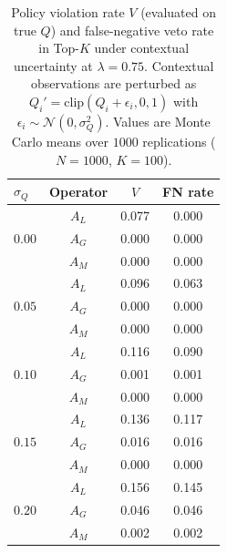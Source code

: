 \begin{table}[H]
\caption{Policy violation rate $V$ (evaluated on true $Q$) and false-negative veto rate in Top-$K$ under contextual uncertainty at $\lambda=0.75$. Contextual observations are perturbed as $Q_i'=\mathrm{clip}(Q_i+\epsilon_i,0,1)$ with $\epsilon_i\sim\mathcal{N}(0,\sigma_Q^2)$. Values are Monte Carlo means over $1000$ replications ($N=1000$, $K=100$).}
\label{tab:contextual-noise}
\centering
\small
\renewcommand{\arraystretch}{1.2}
\begin{tabular}{lccc}
\toprule
$\sigma_Q$ & Operator & $V$ & FN rate \\
\midrule
\multirow{3}{*}{$0.00$} & $A_L$ & 0.077 & 0.000 \\
 & $A_G$ & 0.000 & 0.000 \\
 & $A_M$ & 0.000 & 0.000 \\
\midrule
\multirow{3}{*}{$0.05$} & $A_L$ & 0.096 & 0.063 \\
 & $A_G$ & 0.000 & 0.000 \\
 & $A_M$ & 0.000 & 0.000 \\
\midrule
\multirow{3}{*}{$0.10$} & $A_L$ & 0.116 & 0.090 \\
 & $A_G$ & 0.001 & 0.001 \\
 & $A_M$ & 0.000 & 0.000 \\
\midrule
\multirow{3}{*}{$0.15$} & $A_L$ & 0.136 & 0.117 \\
 & $A_G$ & 0.016 & 0.016 \\
 & $A_M$ & 0.000 & 0.000 \\
\midrule
\multirow{3}{*}{$0.20$} & $A_L$ & 0.156 & 0.145 \\
 & $A_G$ & 0.046 & 0.046 \\
 & $A_M$ & 0.002 & 0.002 \\
\bottomrule
\end{tabular}
\end{table}
